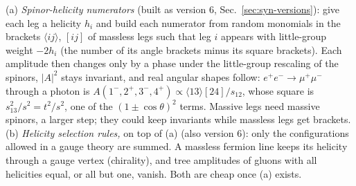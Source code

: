 \documentclass[11pt]{article}
\begin{document}
(a) \emph{Spinor-helicity numerators} (built as version $6$, Sec.~\ref{sec:syn-versions}): give each leg a helicity $h_i$ and build each numerator from random monomials in
the brackets $\langle ij\rangle$, $[ij]$ of massless legs such that leg $i$ appears with little-group weight $-2h_i$
(the number of its angle brackets minus its square brackets). Each amplitude then changes only by a phase under the little-group
rescaling of the spinors, $|A|^2$ stays invariant, and real angular shapes follow: $e^+e^-\to\mu^+\mu^-$ through a photon is
$A(1^-,2^+,3^-,4^+)\propto\langle13\rangle[24]/s_{12}$, whose square is $s_{13}^2/s^2=t^2/s^2$, one of the $(1\pm\cos\theta)^2$ terms. Massive
legs need massive spinors, a larger step; they could keep invariants while massless legs get brackets.
(b) \emph{Helicity selection rules,} on top of (a) (also version $6$): only the configurations allowed in a gauge theory are summed. A
massless fermion line keeps its helicity through a gauge vertex (chirality), and tree amplitudes of gluons with all
helicities equal, or all but one, vanish. Both are cheap once (a) exists.
\end{document}

